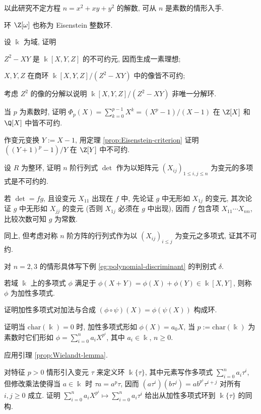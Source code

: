 \begin{Exercises}
\begin{compactenum}[(i)]
			\item 以此研究不定方程 $n = x^2 + xy + y^2$ 的解数, 可从 $n$ 是素数的情形入手.
		\end{compactenum}
		环 $\Z[\omega]$ 也称为 Eisenstein 整数环.
	\item 设 $\Bbbk$ 为域, 证明
		\begin{inparaenum}[(i)]
			\item $Z^2-XY$ 是 $\Bbbk[X,Y,Z]$ 的不可约元, 因而生成一素理想;
			\item $X, Y, Z$ 在商环 $\Bbbk[X,Y,Z]/(Z^2-XY)$ 中的像皆不可约;
			\item 考虑 $Z^2$ 的像的分解以说明 $\Bbbk[X,Y,Z]/(Z^2-XY)$ 非唯一分解环.
		\end{inparaenum}
	\item 当 $p$ 为素数时, 证明 $\Phi_p(X) = \sum_{k=0}^{p-1} X^k = (X^p - 1)/(X - 1)$ 在 $\Z[X]$ 和 $\Q[X]$ 中皆不可约. \begin{hint} 作变元变换 $Y := X-1$, 用定理 \ref{prop:Eisenstein-criterion} 证明 $\left( (Y+1)^p - 1\right)/Y$ 在 $\Z[Y]$ 中不可约. \end{hint}
	\item 设 $R$ 为整环, 证明 $n$ 阶行列式 $\det$ 作为以矩阵元 $(X_{ij})_{1 \leq i,j \leq n}$ 为变元的多项式是不可约的. \begin{hint} 若 $\det = fg$, 且设变元 $X_{11}$ 出现在 $f$ 中, 先论证 $g$ 中无形如 $X_{1j}$ 的变元, 其次论证 $g$ 中无形如 $X_{jj}$ 的变元 (否则 $X_{1j}$ 必须在 $g$ 中出现), 因而 $f$ 包含项 $X_{11} \cdots X_{nn}$, 比较次数可知 $g$ 为常数. \end{hint}
	\item 同上, 但考虑对称 $n$ 阶方阵的行列式作为以 $(X_{ij})_{i \leq j}$ 为变元之多项式, 证其不可约.
	\item 对 $n=2,3$ 的情形具体写下例 \ref{eg:polynomial-discriminant} 的判别式 $\delta$.
	\item 若域 $\Bbbk$ 上的多项式 $\phi$ 满足于 $\phi(X+Y)=\phi(X)+\phi(Y) \in \Bbbk[X,Y]$, 则称 $\phi$ 为加性多项式.
		\begin{compactenum}[(i)]
			\item 证明加性多项式对加法与合成 $(\phi \circ \psi)(X) = \phi(\psi(X))$ 构成环.
			\item 证明当 $\text{char}(\Bbbk)=0$ 时, 加性多项式形如 $\phi(X) = a_0 X$, 当 $p := \text{char}(\Bbbk)$ 为素数时它们形如 $\phi = \sum_{i=0}^n a_i X^{p^i}$, 其中 $a_i \in \Bbbk$, $n \geq 0$. \begin{hint} 应用引理 \ref{prop:Wielandt-lemma}.\end{hint}
			\item 对特征 $p > 0$ 情形引入变元 $\tau$ 来定义环 $\Bbbk\{\tau\}$, 其中元素写作多项式 $\sum_{i=0}^n a_i \tau^i$, 但修改乘法使得当 $a \in \Bbbk$ 时 $\tau a = a^p \tau$, 因而 $(a \tau^i)(b\tau^j) = ab^{p^i} \tau^{i+j}$ 对所有 $i,j \geq 0$ 成立. 证明 $\sum_{i=0}^n a_i X^{p^i} \mapsto \sum_{i=0}^n a_i \tau^i$ 给出从加性多项式环到 $\Bbbk\{\tau\}$ 的同构.
		\end{compactenum}
\end{Exercises}